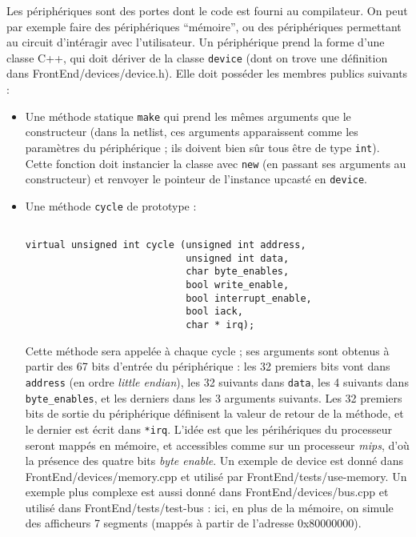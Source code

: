 \documentclass{article}
\begin{document}
Les périphériques sont des portes dont le code est fourni au compilateur. On peut par exemple faire des périphériques ``mémoire'', ou des périphériques permettant au circuit d'intéragir avec l'utilisateur. Un périphérique prend la forme d'une classe C++, qui doit dériver de la classe \texttt{device} (dont on trove une définition dans FrontEnd/devices/device.h). Elle doit posséder les membres publics suivants :
\begin{itemize}
\item Une méthode statique \texttt{make} qui prend les mêmes arguments que le constructeur (dans la netlist, ces arguments apparaissent comme les paramètres du périphérique ; ils doivent bien sûr tous être de type \texttt{int}). Cette fonction doit instancier la classe avec \texttt{new} (en passant ses arguments au constructeur) et renvoyer le pointeur de l'instance upcasté en \texttt{device}.
\item Une méthode \texttt{cycle} de prototype :
\begin{verbatim}

virtual unsigned int cycle (unsigned int address,
                            unsigned int data,
                            char byte_enables,
                            bool write_enable,
                            bool interrupt_enable,
                            bool iack,
                            char * irq);

\end{verbatim}
Cette méthode sera appelée à chaque cycle ; ses arguments sont obtenus à partir des 67 bits d'entrée du périphérique : les 32 premiers bits vont dans \texttt{address} (en ordre \emph{little endian}), les 32 suivants dans \texttt{data}, les 4 suivants dans \texttt{byte\_enables}, et les derniers dans les 3 arguments suivants. Les 32 premiers bits de sortie du périphérique définisent la valeur de retour de la méthode, et le dernier est écrit dans \texttt{*irq}. L'idée est que les périhériques du processeur seront mappés en mémoire, et accessibles comme sur un processeur \emph{mips}, d'où la présence des quatre bits \emph{byte enable}. Un exemple de device est donné dans FrontEnd/devices/memory.cpp et utilisé par FrontEnd/tests/use-memory. Un exemple plus complexe est aussi donné dans FrontEnd/devices/bus.cpp et utilisé dans FrontEnd/tests/test-bus : ici, en plus de la mémoire, on simule des afficheurs 7 segments (mappés à partir de l'adresse 0x80000000).
\end{itemize}
\end{document}
